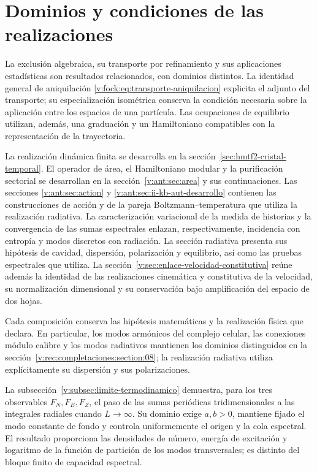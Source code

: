 \section{Dominios y condiciones de las realizaciones}
\label{v:integracion}
La exclusión algebraica, su transporte por refinamiento y sus aplicaciones
estadísticas son resultados relacionados, con dominios distintos.
La identidad general de aniquilación
\eqref{v:fock:eq:transporte-aniquilacion} explicita el adjunto del transporte;
su especialización isométrica conserva la condición necesaria sobre la
aplicación entre los espacios de una partícula. Las ocupaciones de
equilibrio utilizan, además, una graduación y un Hamiltoniano compatibles
con la representación de la trayectoria.

La realización dinámica finita se desarrolla en la
sección~\ref{sec:hmtf2-cristal-temporal}. El operador de área, el
Hamiltoniano modular y la purificación sectorial se desarrollan en la
sección~\ref{v:ant:sec:area} y sus continuaciones. Las secciones
\ref{v:ant:sec:action} y \ref{v:ant:sec:ii-kb-aut-desarrollo} contienen
las construcciones de acción y de la pareja Boltzmann--temperatura que
utiliza la realización radiativa. La caracterización variacional de la
medida de historias y la convergencia de las sumas espectrales enlazan,
respectivamente, incidencia con entropía y modos discretos con radiación.
La sección radiativa
presenta sus hipótesis de cavidad,
dispersión, polarización y equilibrio, así como las pruebas espectrales
que utiliza. La sección~\ref{v:sec:enlace-velocidad-constitutiva}
reúne además la identidad de las realizaciones cinemática y constitutiva
de la velocidad, su normalización dimensional y su conservación bajo
amplificación del espacio de dos hojas.

Cada composición conserva las hipótesis matemáticas y la realización
física que declara. En particular, los modos armónicos del complejo
celular, las conexiones módulo calibre y los modos radiativos mantienen
los dominios distinguidos en la
sección~\ref{v:rec:completaciones:section:08}; la realización radiativa
utiliza explícitamente su dispersión y sus polarizaciones.

La subsección~\ref{v:subsec:limite-termodinamico} demuestra, para los tres
observables \(F_N,F_E,F_Z\), el paso de las sumas periódicas tridimensionales
a las integrales radiales cuando \(L\to\infty\). Su dominio exige \(a,b>0\),
mantiene fijado el modo constante de fondo y controla uniformemente el origen
y la cola espectral. El resultado proporciona las densidades de número,
energía de excitación y logaritmo de la función de partición de los modos
transversales; es distinto del bloque finito de capacidad espectral.

